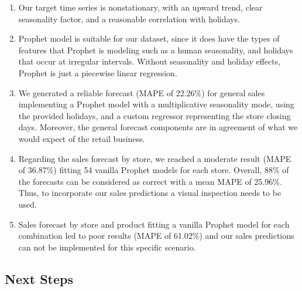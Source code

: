 \begin{enumerate}
\item Our target time series is nonstationary, with an upward trend, clear seasonality factor, and a reasonable correlation with holidays. 
\item Prophet model is suitable for our dataset, since it does have the types of features that Prophet is modeling such as a human seasonality, and holidays that occur at irregular intervals. Without seasonality and holiday effects, Prophet is just a piecewise linear regression.
\item We generated a reliable forecast (MAPE of 22.26\%) for general sales implementing a Prophet model with a multiplicative seasonality mode, using the provided holidays, and a custom regressor representing the store closing days. Moreover, the general forecast components are in agreement of what we would expect of the retail business. 
\item Regarding the sales forecast by store, we reached a moderate result (MAPE of 36.87\%) fitting 54 vanilla Prophet models for each store. Overall, 88\% of the forecasts can be considered as correct with a mean MAPE of 25.96\%. Thus, to incorporate our sales predictions a visual inspection needs to be used.
\item Sales forecast by store and product fitting a vanilla Prophet model for each combination led to poor results (MAPE of 61.02\%) and our sales predictions can not be implemented for this specific scenario. 
\end{enumerate}

\subsection[Next Steps]{Next Steps}
\label{sec:next-steps}

